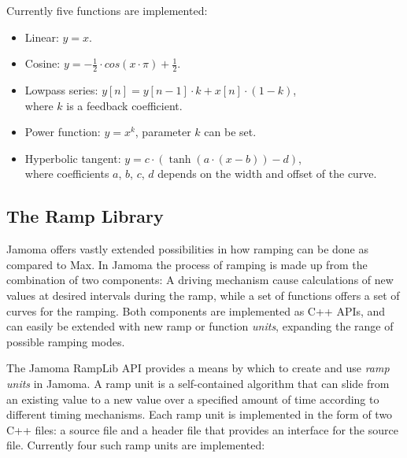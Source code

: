 \documentclass{article}
\begin{document}
Currently five functions are implemented: 

\begin{itemize}
	\item Linear: $y = x$.
	\item Cosine: $y = - \frac{1}{2} \cdot cos(x \cdot \pi ) + \frac{1}{2} $.
	\item Lowpass series: $y[n] = y[n-1] \cdot k + x[n] \cdot (1-k)$, \\ where $k$ is a feedback coefficient.
	\item Power function: $ y = x^{k} $, parameter $k$ can be set.
	\item Hyperbolic tangent: $ y = c \cdot (\tanh(a\cdot(x-b)) - d) $, \\ where coefficients $a$, $b$, $c$, $d$ depends on the width and offset of the curve.
\end{itemize}




\subsection{The Ramp Library} %
\label{sec:ramplib}

Jamoma offers vastly extended possibilities in how ramping can be done as compared to Max. In Jamoma the process of ramping is made up from the combination of two components: A driving mechanism cause calculations of new values at desired intervals during the ramp, while a set of functions offers a set of curves for the ramping. Both components are implemented as C++ APIs, and can easily be extended with new ramp or function \emph{units}, expanding the range of possible ramping modes. %

The Jamoma RampLib API provides a means by which to create and use \emph{ramp units} in Jamoma.  A ramp unit is a self-contained algorithm that can slide from an existing value to a new value over a specified amount of time according to different timing mechanisms. Each ramp unit is implemented in the form of two C++ files: a source file and a header file that provides an interface for the source file. Currently four such ramp units are implemented:
\end{document}
